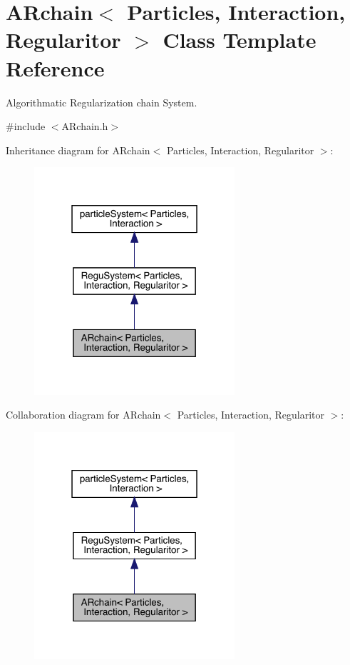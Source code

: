 \hypertarget{class_a_rchain}{}\section{A\+Rchain$<$ Particles, Interaction, Regularitor $>$ Class Template Reference}
\label{class_a_rchain}


Algorithmatic Regularization chain System.  




{\ttfamily \#include $<$A\+Rchain.\+h$>$}



Inheritance diagram for A\+Rchain$<$ Particles, Interaction, Regularitor $>$\+:
\nopagebreak
\begin{figure}[H]
\begin{center}
\leavevmode
\includegraphics[width=211pt]{class_a_rchain__inherit__graph}
\end{center}
\end{figure}


Collaboration diagram for A\+Rchain$<$ Particles, Interaction, Regularitor $>$\+:
\nopagebreak
\begin{figure}[H]
\begin{center}
\leavevmode
\includegraphics[width=211pt]{class_a_rchain__coll__graph}
\end{center}
\end{figure}
